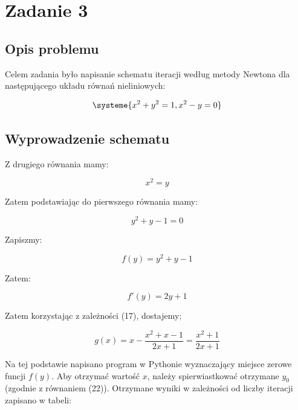 \documentclass{article}
\begin{document}
	\newpage


	\section*{Zadanie 3}

	\subsection*{Opis problemu}

	Celem zadania było napisanie schematu iteracji według metody Newtona dla następującego układu równań nieliniowych:

	\begin{equation}
		\systeme{x^2+y^2 = 1, x^2 - y = 0}
	\end{equation}

	\subsection*{Wyprowadzenie schematu}

	Z drugiego równania mamy:

	\begin{equation}
		x^2 = y
	\end{equation}

	Zatem podstawiając do pierwszego równania mamy:

	\begin{equation}
		y^2 +y - 1 = 0
	\end{equation}

	Zapiszmy:

	\begin{equation}
		f(y) = y^2 + y - 1
	\end{equation}

	Zatem:

	\begin{equation}
		f'(y) = 2y + 1
	\end{equation}

	Zatem korzystając z zależności (17), dostajemy;

	\begin{equation}
		g(x) = x - \frac{x^2 + x - 1}{2x+1} = \frac{x^2+1}{2x+1}
	\end{equation}

	Na tej podstawie napisano program w Pythonie wyznaczający miejsce zerowe funcji $f(y)$. Aby otrzymać wartość $x$, należy spierwiastkować otrzymane $y_0$ (zgodnie z równaniem (22)). Otrzymane wyniki w zależności od liczby iteracji zapisano w tabeli:
\end{document}
